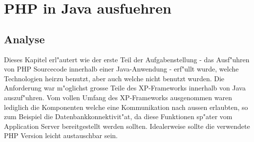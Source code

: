 \chapter{PHP in Java ausfuehren}
\label{sec:chap1}

\section{Analyse}
\label{sec:chap1:ana}
Dieses Kapitel erl"autert wie der erste Teil der Aufgabenstellung - das Ausf"uhren von PHP Sourcecode innerhalb
einer Java-Anwendung - erf"ullt wurde, welche Technologien heirzu benutzt, aber auch welche nicht benutzt wurden.
Die Anforderung war m"oglichst grosse Teile des XP-Frameworks innerhalb von Java auszuf"uhren.
Vom vollen Umfang des XP-Frameworks ausgenommen waren lediglich die Komponenten welche eine Kommunikation
nach aussen erlaubten, so zum Beispiel die Datenbankkonnektivit"at, da diese Funktionen sp"ater vom Application Server
bereitgestellt werden sollten. Idealerweise sollte die verwendete PHP Version leicht austauschbar sein.

